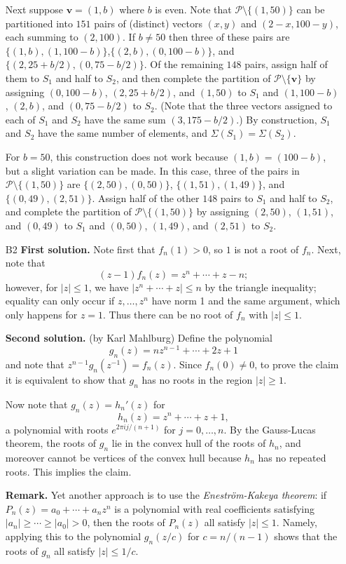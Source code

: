 \documentclass[amssymb,twocolumn,pra,10pt,aps]{revtex4-1}
\begin{document}
\begin{itemize}
Next suppose $\mathbf{v} = (1,b)$ where $b$ is even. Note that $\mathcal{P} \setminus \{(1,50)\}$ can be partitioned into $151$ pairs of (distinct) vectors $(x,y)$ and $(2-x,100-y)$, each summing to $(2,100)$. If $b \neq 50$ then three of these pairs are $\{(1,b),(1,100-b)\}$,$\{(2,b),(0,100-b)\}$, and $\{(2,25+b/2),(0,75-b/2)\}$. Of the remaining $148$ pairs, assign half of them to $S_1$ and half to $S_2$, and then complete the partition of $\mathcal{P} \setminus \{\mathbf{v}\}$ by assigning $(0,100-b)$, $(2,25+b/2)$, and $(1,50)$ to $S_1$ and $(1,100-b)$, $(2,b)$, and $(0,75-b/2)$ to $S_2$. (Note that the three vectors assigned to each of $S_1$ and $S_2$ have the same sum $(3,175-b/2)$.) By construction, $S_1$ and $S_2$ have the same number of elements, and $\Sigma(S_1) = \Sigma(S_2)$.

For $b=50$, this construction does not work because $(1,b) = (100-b)$, but a slight variation can be made.
 In this case, three of the pairs in $\mathcal{P} \setminus \{(1,50)\}$ are $\{(2,50),(0,50)\}$, $\{(1,51),(1,49)\}$, and $\{(0,49),(2,51)\}$. Assign half of the other $148$ pairs to $S_1$ and half to $S_2$, and complete the partition of
$\mathcal{P} \setminus \{(1,50)\}$ by assigning $(2,50)$, $(1,51)$, and $(0,49)$ to $S_1$ and $(0,50)$, $(1,49)$, and $(2,51)$ to $S_2$.


\item[B2]
\textbf{First solution.}
Note first that $f_n(1) > 0$, so $1$ is not a root of $f_n$.
Next, note that
\[
(z-1)f_n(z) = z^n + \cdots + z - n;
\]
however, for $\left| z \right| \leq 1$, we have 
$\left| z^n + \cdots + z \right| \leq n$ by the triangle inequality;
equality can only occur if $z,\dots,z^n$ have norm 1 and the same argument, which only happens for $z=1$.
Thus there can be no root of $f_n$ with $|z| \leq 1$.


\noindent
\textbf{Second solution.}
(by Karl Mahlburg)
Define the polynomial
\[
g_n(z) = nz^{n-1} + \cdots + 2z + 1
\]
and note that $z^{n-1} g_n(z^{-1}) = f_n(z)$.
Since $f_n(0) \neq 0$, to prove the claim it is equivalent to show that $g_n$
has no roots in the region $|z| \geq 1$.

Now note that $g_n(z) = h_n'(z)$ for
\[
h_n(z) = z^n + \cdots + z + 1,
\]
a polynomial with roots $e^{2\pi ij/(n+1)}$ for $j=0,\dots,n$.
By the Gauss-Lucas theorem, the roots of $g_n$ lie in the convex hull of the roots of $h_n$,
and moreover cannot be vertices of the convex hull because $h_n$ has no repeated roots.
This implies the claim.

\noindent
\textbf{Remark.}
Yet another approach is to use the \emph{Enestr\"om-Kakeya theorem}: if $P_n(z) = a_0 + \cdots + a_n z^n$
is a polynomial with real coefficients satisfying $|a_n|  \geq \cdots \geq |a_0| > 0$, then the roots of $P_n(z)$
all satisfy $|z| \leq 1$. Namely, applying this to the polynomial $g_n(z/c)$ for 
$c = n/(n-1)$ shows that the roots of $g_n$ all satisfy $\left|z \right| \leq 1/c$. 


\end{itemize}
\end{document}
